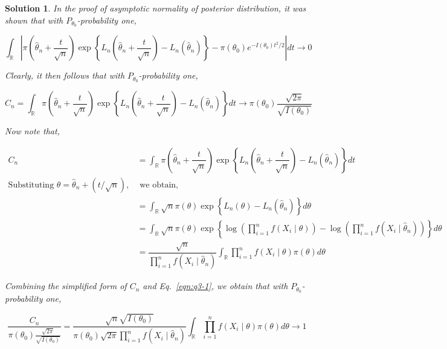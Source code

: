 \documentclass[12pt]{article}
\theoremstyle{problemstyle}
\newtheorem*{solution*}{Solution}
\newcommand{\R}{\mathbb{R}}
\begin{document}
\begin{solution*}
    In the proof of asymptotic normality of posterior distribution, it was shown that with $P_{\theta_0}$-probability one, 

    $$
    \int_{\R} \left\vert \pi\left(\widehat{\theta}_n + \dfrac{t}{\sqrt{n}} \right) \exp\left\{ L_n\left(\widehat{\theta}_n + \dfrac{t}{\sqrt{n}} \right) - L_n(\widehat{\theta}_n)\right\} - \pi(\theta_0) e^{-I(\theta_0)t^2/2} \right\vert dt \rightarrow 0
    $$

    Clearly, it then follows that with $P_{\theta_0}$-probability one,

    \begin{equation}
        C_n = \int_{\R} \pi\left(\widehat{\theta}_n + \dfrac{t}{\sqrt{n}} \right) \exp\left\{ L_n\left(\widehat{\theta}_n + \dfrac{t}{\sqrt{n}} \right) - L_n(\widehat{\theta}_n)\right\}dt \rightarrow \pi(\theta_0) \dfrac{\sqrt{2\pi}}{\sqrt{I(\theta_0)}}
        \label{eqn:q3-1}        
    \end{equation}

    Now note that,

    \begin{align*}
        C_n
        & = \int_{\R} \pi\left(\widehat{\theta}_n + \dfrac{t}{\sqrt{n}} \right) \exp\left\{ L_n\left(\widehat{\theta}_n + \dfrac{t}{\sqrt{n}} \right) - L_n(\widehat{\theta}_n)\right\}dt\\
        \text{Substituting } \theta = \widehat{\theta}_n + (t/\sqrt{n}),
        & \text{ we obtain, }\\
        & = \int_{\R} \sqrt{n} \pi\left(\theta \right) \exp\left\{ L_n\left(\theta\right) - L_n(\widehat{\theta}_n)\right\}d\theta\\
        & = \int_{\R} \sqrt{n} \pi\left(\theta \right) \exp\left\{ \log \left( \prod_{i=1}^n f(X_i \mid \theta) \right) - \log \left( \prod_{i=1}^n f(X_i \mid \widehat{\theta}_n ) \right) \right\}d\theta\\
        & = \dfrac{\sqrt{n}}{\prod_{i=1}^n f(X_i \mid \widehat{\theta}_n )} \int_{\R} \prod_{i=1}^n f(X_i \mid \theta) \pi(\theta) d\theta
    \end{align*}

    Combining the simplified form of $C_n$ and Eq.~\eqref{eqn:q3-1}, we obtain that with $P_{\theta_0}$-probability one, 

    \begin{equation*}
        \dfrac{C_n}{\pi(\theta_0) \frac{\sqrt{2\pi}}{\sqrt{I(\theta_0)}}} = \dfrac{\sqrt{n} \sqrt{I(\theta_0)}}{\pi(\theta_0) \sqrt{2\pi} \prod_{i=1}^n f(X_i \mid \widehat{\theta}_n ) }  \int_{\R} \prod_{i=1}^n f(X_i \mid \theta) \pi(\theta) d\theta \rightarrow 1
    \end{equation*}


\end{solution*}
\end{document}
